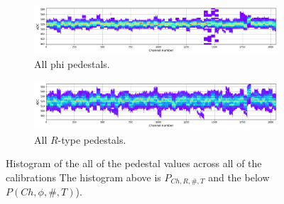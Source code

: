 \begin{figure}
    \centering

    \begin{subfigure}[b]{\textwidth}
    \includegraphics[width=\linewidth]{figures/chapter4/calib_analysis/Part1-phi-pedestals.png}
    \caption{All phi pedestals.}
   \label{plot:ped_r}
  \end{subfigure}

  \begin{subfigure}[b]{\textwidth}
    \includegraphics[width=\linewidth]{figures/chapter4/calib_analysis/Part1-r-pedestals.png}
    \caption{All $R$-type pedestals.}
   \label{plot:ped_phi}
  \end{subfigure}
    \caption{Histogram of the all of the pedestal values across all of the calibrations The histogram above is $P_{Ch, R, \#, T}$ and the below $P(Ch, \phi, \#, T)$).}
    \label{plot:part1-r-phi-pedestals}

  \end{figure}


